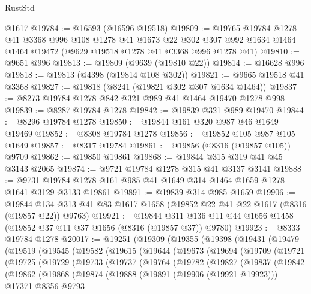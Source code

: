 \begin{lexlean}{RustStd}
\begin{coremodule}
    @1617
@19784 := @16593 (@16596 @19518)
@19809 := @19765
    @19784
    @1278
    @41
    @3368
    @996
    @108
    @1278
    @41
    @1673
    @22
    @302
    @307
    @992
    @1634
    @1464
    @1464
    @19472
    (@9629 @19518 @1278 @41 @3368 @996 @1278 @41)
@19810 := @9651 @996
@19813 := @19809 (@9639 (@19810 @22))
@19814 := @16628 @996
@19818 := @19813 (@4398 (@19814 @108 @302))
@19821 := @9665 @19518 @41 @3368
@19827 := @19818 (@8241 (@19821 @302 @307 @1634 @1464))
@19837 := @8273 @19784 @1278 @842 @321 @989 @41 @1464 @19470 @1278 @998
@19839 := @8287 @19784 @1278
@19842 := @19839 @321 @989 @19470
@19844 := @8296 @19784 @1278
@19850 := @19844 @161 @320 @987 @46 @1649 @19469
@19852 := @8308 @19784 @1278
@19856 := @19852 @105 @987 @105 @1649
@19857 := @8317 @19784
@19861 := @19856 (@8316 (@19857 @105)) @9709
@19862 := @19850 @19861
@19868 := @19844 @315 @319 @41 @45 @3143 @2065
@19874 := @9721 @19784 @1278 @315 @41 @3137 @3141
@19888 := @9731 @19784 @1278 @161 @985 @41 @1649 @314 @1464 @1659 @1278 @1641 @3129 @3133 @19861
@19891 := @19839 @314 @985 @1659
@19906 := @19844 @134 @313 @41 @83 @1617 @1658 (@19852 @22 @41 @22 @1617 (@8316 (@19857 @22)) @9763)
@19921 := @19844 @311 @136 @11 @44 @1656 @1458 (@19852 @37 @11 @37 @1656 (@8316 (@19857 @37)) @9780)
@19923 := @8333 @19784 @1278
@20017 := @19251
    (@19309
      (@19355
        (@19398
          (@19431
            (@19479
              (@19519
                (@19545
                  (@19582
                    (@19615
                      (@19644
                        (@19673
                          (@19694
                            (@19709
                              (@19721
                                (@19725
                                  (@19729
                                    (@19733
                                      (@19737
                                        (@19764
                                          (@19782
                                            (@19827
                                              (@19837
                                                (@19842
                                                  (@19862
                                                    (@19868
                                                      (@19874
                                                        (@19888
                                                          (@19891 (@19906 (@19921 @19923)))
                                                          @17371
                                                          @8356
                                                          @9793

\end{coremodule}
\end{lexlean}

